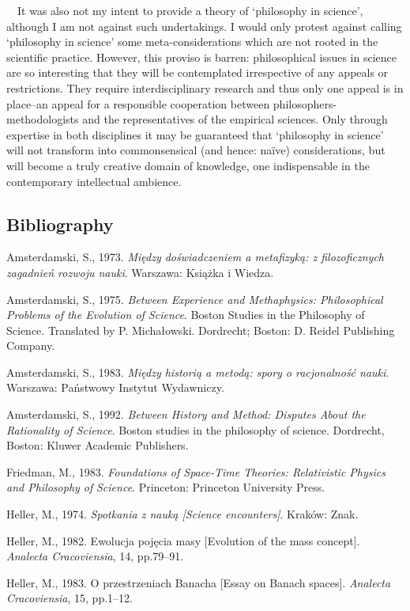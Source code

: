 \documentclass[a4paper]{article}
\begin{document}
\ \ It was also not my intent to provide a theory of ‘philosophy in science’, although I am not against such
undertakings. I would only protest against calling ‘philosophy in science’ some meta-considerations which are not
rooted in the scientific practice. However, this proviso is barren: philosophical issues in science are so interesting
that they will be contemplated irrespective of any appeals or restrictions. They require interdisciplinary research and
thus only one appeal is in place–an appeal for a responsible cooperation between philosophers-methodologists and the
representatives of the empirical sciences. Only through expertise in both disciplines it may be guaranteed that
‘philosophy in science’ will not transform into commonsensical (and hence: naïve) considerations, but will become a
truly creative domain of knowledge, one indispensable in the contemporary intellectual ambience.

\subsection{Bibliography}
Amsterdamski, S., 1973. \textit{Między doświadczeniem a metafizyką: z filozoficznych zagadnień rozwoju nauki}. Warszawa:
Książka i Wiedza.

Amsterdamski, S., 1975. \textit{Between Experience and Methaphysics: Philosophical Problems of the Evolution of
Science}. Boston Studies in the Philosophy of Science. Translated by P. Michałowski. Dordrecht; Boston: D. Reidel
Publishing Company.

Amsterdamski, S., 1983. \textit{Między historią a metodą: spory o racjonalność nauki}. Warszawa: Państwowy Instytut
Wydawniczy.

Amsterdamski, S., 1992. \textit{Between History and Method: Disputes About the Rationality of Science}. Boston studies
in the philosophy of science. Dordrecht, Boston: Kluwer Academic Publishers.

Friedman, M., 1983. \textit{Foundations of Space-Time Theories: Relativistic Physics and Philosophy of
}\textit{Science}. Princeton: Princeton University Press.

Heller, M., 1974. \textit{Spotkania z nauką [Science encounters]}. Kraków: Znak.

Heller, M., 1982. Ewolucja pojęcia masy [Evolution of the mass concept]. \textit{Analecta Cracoviensia}, 14, pp.79–91.

Heller, M., 1983. O przestrzeniach Banacha [Essay on Banach spaces]. \textit{Analecta Cracoviensia}, 15, pp.1–12.
\end{document}
